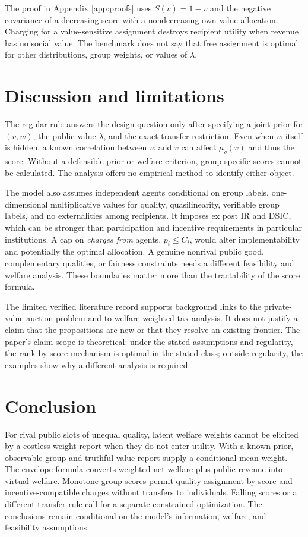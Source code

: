 \documentclass[11pt]{article}
\begin{document}
The proof in Appendix \ref{app:proofs} uses $S(v)=1-v$ and the negative covariance of a decreasing score with a nondecreasing own-value allocation. Charging for a value-sensitive assignment destroys recipient utility when revenue has no social value. The benchmark does not say that free assignment is optimal for other distributions, group weights, or values of $\lambda$.

\section{Discussion and limitations}\label{sec:discussion}

The regular rule answers the design question only after specifying a joint prior for $(v,w)$, the public value $\lambda$, and the exact transfer restriction. Even when $w$ itself is hidden, a known correlation between $w$ and $v$ can affect $\mu_g(v)$ and thus the score. Without a defensible prior or welfare criterion, group-specific scores cannot be calculated. The analysis offers no empirical method to identify either object.

The model also assumes independent agents conditional on group labels, one-dimensional multiplicative values for quality, quasilinearity, verifiable group labels, and no externalities among recipients. It imposes ex post IR and DSIC, which can be stronger than participation and incentive requirements in particular institutions. A cap on \emph{charges from} agents, $p_i\le C_i$, would alter implementability and potentially the optimal allocation. A genuine nonrival public good, complementary qualities, or fairness constraints needs a different feasibility and welfare analysis. These boundaries matter more than the tractability of the score formula.

The limited verified literature record supports background links to the private-value auction problem and to welfare-weighted tax analysis. It does not justify a claim that the propositions are new or that they resolve an existing frontier. The paper's claim scope is theoretical: under the stated assumptions and regularity, the rank-by-score mechanism is optimal in the stated class; outside regularity, the examples show why a different analysis is required.

\section{Conclusion}

For rival public slots of unequal quality, latent welfare weights cannot be elicited by a costless weight report when they do not enter utility. With a known prior, observable group and truthful value report supply a conditional mean weight. The envelope formula converts weighted net welfare plus public revenue into virtual welfare. Monotone group scores permit quality assignment by score and incentive-compatible charges without transfers to individuals. Falling scores or a different transfer rule call for a separate constrained optimization. The conclusions remain conditional on the model's information, welfare, and feasibility assumptions.
\end{document}
